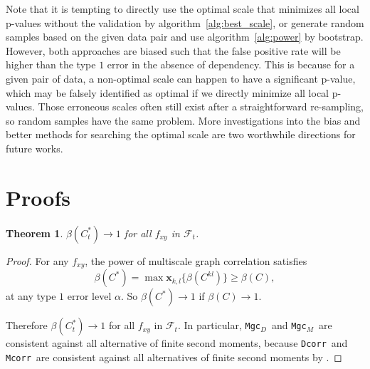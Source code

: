 \documentclass[11pt]{article}
\providecommand{\sct}[1]{{\sc \texttt{#1}}}
\providecommand{\mb}[1]{\boldsymbol{#1}}
\providecommand{\mc}[1]{\mathcal{#1}}
\newcommand{\G}{C}
\newcommand{\Mgc}{\sct{Mgc}}
\newcommand{\Mgcd}{\sct{Mgc$_D$}}
\newcommand{\Mgcm}{\sct{Mgc$_M$}}
\newcommand{\Dcorr}{\sct{Dcorr}}
\newcommand{\Mcorr}{\sct{Mcorr}}
\newcommand{\mbx}{\ensuremath{\mb{x}}}
\newtheorem{appThm}{Theorem}
\begin{document}
Note that it is tempting to directly use the optimal scale that minimizes all local p-values without the validation by algorithm~\ref{alg:best_scale}, or generate random samples based on the given data pair and use algorithm~\ref{alg:power} by bootstrap. However, both approaches are biased such that the false positive rate will be higher than the type $1$ error in the absence of dependency. This is because for a given pair of data, a non-optimal scale can happen to have a significant p-value, which may be falsely identified as optimal if we directly minimize all local p-values. Those erroneous scales often still exist after a straightforward re-sampling, so random samples have the same problem. More investigations into the bias and better methods for searching the optimal scale are two worthwhile directions for future works.


\section{Proofs}
\label{appen:proofs}
\begin{appThm}
$\beta(\G_t^*) \rightarrow 1$ for all $f_{xy}$ in $\mc{F}_t$.
\end{appThm}
\begin{proof}
For any $f_{xy}$, the power of multiscale graph correlation satisfies
\begin{equation}
\beta(\G^{*})=\max\mbx_{k,l}\{\beta(\G^{kl})\} \geq \beta(\G),
\end{equation}
at any type $1$ error level $\alpha$. So $\beta(\G^{*}) \rightarrow 1$ if $\beta(\G) \rightarrow 1$.

Therefore $\beta(\G_t^*) \rightarrow 1$ for all $f_{xy}$ in $\mc{F}_t$. In particular, \Mgcd~and \Mgcm~are consistent against all alternative of finite second moments, because \Dcorr~and \Mcorr~are consistent against all alternatives of finite second moments by \cite{SzekelyRizzoBakirov2007, SzekelyRizzo2013a}.
\end{proof}
\end{document}

